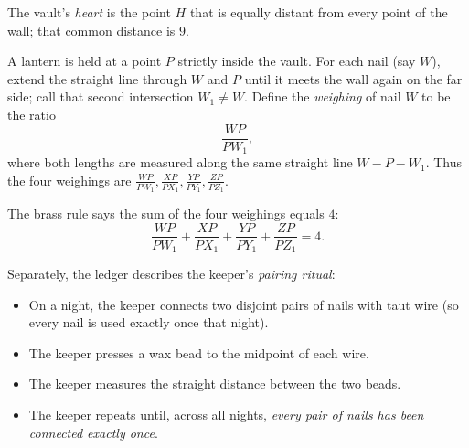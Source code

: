 
\Problem

The vault’s \emph{heart} is the point \(H\) that is equally distant from every point of the wall; that common distance is \(9\).

A lantern is held at a point \(P\) strictly inside the vault. For each nail (say \(W\)), extend the straight line through \(W\) and \(P\) until it meets the wall again on the far side; call that second intersection \(W_1\neq W\). Define the \emph{weighing} of nail \(W\) to be the ratio
\[
\frac{WP}{PW_1},
\]
where both lengths are measured along the same straight line \(W\!-\!P\!-\!W_1\).
Thus the four weighings are \(\frac{WP}{PW_1},\frac{XP}{PX_1},\frac{YP}{PY_1},\frac{ZP}{PZ_1}\).

The brass rule says the sum of the four weighings equals \(4\):
\[
\frac{WP}{PW_1}+\frac{XP}{PX_1}+\frac{YP}{PY_1}+\frac{ZP}{PZ_1}=4.
\]

Separately, the ledger describes the keeper’s \emph{pairing ritual}:

\begin{itemize}
\item On a night, the keeper connects two disjoint pairs of nails with taut wire (so every nail is used exactly once that night).
\item The keeper presses a wax bead to the midpoint of each wire.
\item The keeper measures the straight distance between the two beads.
\item The keeper repeats until, across all nights, \emph{every pair of nails has been connected exactly once}.
\end{itemize}

